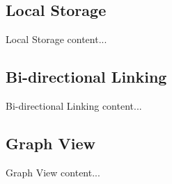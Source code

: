 \documentclass[10pt, xcolor=dvipsnames]{beamer}
\begin{document}
	\subsection{Local Storage}
	\begin{frame}{Local Storage}
		content...
	\end{frame}

	\subsection{Bi-directional Linking}
	\begin{frame}{Bi-directional Linking}
		content...
	\end{frame}

	\subsection{Graph View}
	\begin{frame}{Graph View}
		content...
	\end{frame}
	
\end{document}
